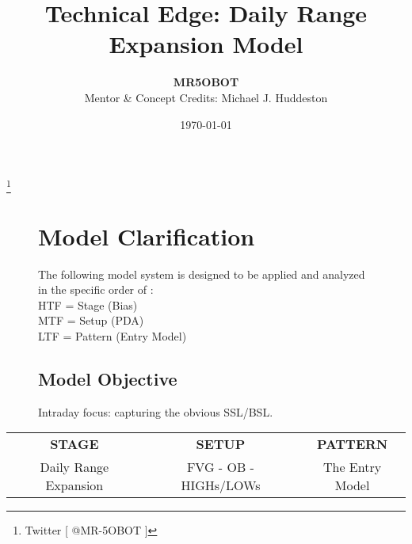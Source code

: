 \documentclass{article}
\title{Technical Edge: Daily Range Expansion Model}
\author{\textbf{MR5OBOT} \\ \small{Mentor \& Concept Credits: Michael J. Huddeston}}
\date{\today}
\begin{document}
\maketitle


\renewcommand{\thefootnote}{}
\footnote{Twitter [ @MR-5OBOT ]}
\vspace{0.8cm}

\begin{figure}[h]
  \begin{minipage}{.5\textwidth}
  \end{minipage}
  \begin{minipage}{.45\textwidth}
    \centering
    \section{Model Clarification}
    The following model system is designed to be applied and analyzed in the specific order of : \\
    \vspace{0.5cm}
    HTF = Stage (Bias)\\
    \vspace{0.2cm}
    MTF = Setup (PDA) \\
    \vspace{0.2cm}
    LTF = Pattern (Entry Model)\\
    \vspace{0.2cm}
    \subsection{Model Objective}
    Intraday focus: capturing the obvious SSL/BSL.
  \end{minipage}
\end{figure}
\vspace{1.5cm}


\begin{table}[h!]
\centering
{}
\renewcommand{\arraystretch}{2}
\setlength{\tabcolsep}{30pt}
\begin{tabular}{|c|c|c|}
  \hline
  \multirow{2}{*}{\textbf{STAGE}} & \multirow{2}{*}{\textbf{SETUP}} & \multirow{2}{*}{\textbf{PATTERN}} \\
   & & \\
  \hline
  Daily Range Expansion & \rule{0pt}{60pt}FVG - OB - HIGHs/LOWs\rule[-60pt]{0pt}{0pt} & \-  The Entry Model  \- \\
  \hline
\end{tabular}
\end{table}
\newpage
\end{document}

